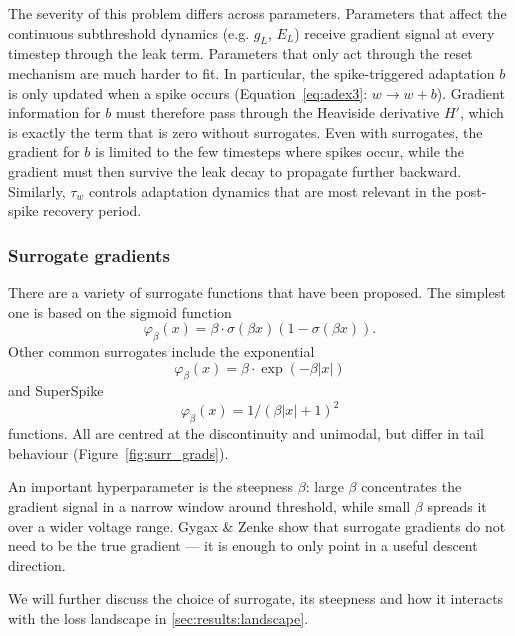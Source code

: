 The severity of this problem differs across parameters.
Parameters that affect the continuous subthreshold dynamics (e.g. $g_L$, $E_L$) receive gradient signal at every timestep through the leak term.
Parameters that only act through the reset mechanism are much harder to fit.
In particular, the spike-triggered adaptation $b$ is only updated when a spike occurs (Equation~\ref{eq:adex3}: $w \rightarrow w + b$).
Gradient information for $b$ must therefore pass through the Heaviside derivative $H'$, which is exactly the term that is zero without surrogates.
Even with surrogates, the gradient for $b$ is limited to the few timesteps where spikes occur, while the gradient must then survive the leak decay to propagate further backward.
Similarly, $\tau_w$ controls adaptation dynamics that are most relevant in the post-spike recovery period.

\subsubsection{Surrogate gradients}\label{sec:bg:sg:surrogate-gradients}

There are a variety of surrogate functions that have been proposed.
The simplest one is based on the sigmoid function
\begin{equation}
  \varphi_\beta(x) = \beta \cdot \sigma(\beta x)(1 - \sigma(\beta x)).
  \label{eq:sigmoid-surrogate}
\end{equation}
Other common surrogates include the exponential
\begin{equation}
  \varphi_\beta(x) = \beta \cdot \exp(-\beta|x|)
  \label{eq:exponential-surrogate}
\end{equation}
and SuperSpike\cite{Zenke2018}
\begin{equation}
  \varphi_\beta(x) = 1/(\beta|x| + 1)^2
  \label{eq:superspike-surrogate}
\end{equation}
functions.
All are centred at the discontinuity and unimodal, but differ in tail behaviour (Figure~\ref{fig:surr_grads}).

An important hyperparameter is the steepness $\beta$:
large $\beta$ concentrates the gradient signal in a narrow window around threshold, while small $\beta$ spreads it over a wider voltage range.
Gygax \& Zenke \cite{Gygax2025} show that surrogate gradients do not need to be the true gradient --- it is enough to only point in a useful descent direction.

We will further discuss the choice of surrogate, its steepness and how it interacts with the loss landscape in \cref{sec:results:landscape}.

